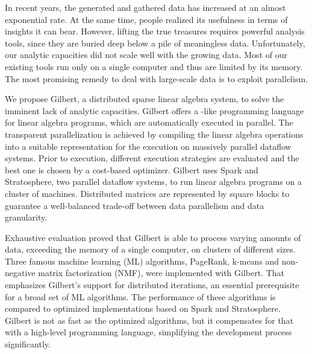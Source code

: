 \clearemptydoublepage
{}
{}

\vspace*{2cm}
\begin{center}
\end{center}
\vspace{1cm}

In recent years, the generated and gathered data has increased at an almost exponential rate.
At the same time, people realized its usefulness in terms of insights it can bear.
However, lifting the true treasures requires powerful analysis tools, since they are buried deep below a pile of meaningless data.
Unfortunately, our analytic capacities did not scale well with the growing data.
Most of our existing tools run only on a single computer and thus are limited by its memory.
The most promising remedy to deal with large-scale data is to exploit parallelism.

We propose Gilbert, a distributed sparse linear algebra system, to solve the imminent lack of analytic capacities.
Gilbert offers a \matlab-like programming language for linear algebra programs, which are automatically executed in parallel.
The transparent parallelization is achieved by compiling the linear algebra operations into a suitable representation for the execution on massively parallel dataflow systems.
Prior to execution, different execution strategies are evaluated and the best one is chosen by a cost-based optimizer.
Gilbert uses Spark and Stratosphere, two parallel dataflow systems, to run linear algebra programs on a cluster of machines.
Distributed matrices are represented by square blocks to guarantee a well-balanced trade-off between data parallelism and data granularity.

Exhaustive evaluation proved that Gilbert is able to process varying amounts of data, exceeding the memory of a single computer, on clusters of different sizes.
Three famous machine learning (ML) algorithms, PageRank, k-means and non-negative matrix factorization (NMF), were implemented with Gilbert.
That emphasizes Gilbert's support for distributed iterations, an essential prerequisite for a broad set of ML algorithms.
The performance of these algorithms is compared to optimized implementations based on Spark and Stratosphere.
Gilbert is not as fast as the optimized algorithms, but it compensates for that with a high-level programming language, simplifying the development process significantly.